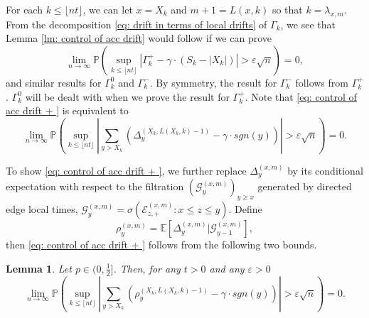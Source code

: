 \documentclass[twoside,12pt, a4paper]{article}
\newtheorem{lemma}{Lemma}[section]
\numberwithin{equation}{section}
\theoremstyle{remark}
\newcommand{\abs}[1]{\left\vert #1 \right\vert}
\newcommand{\comment}[1]{\textcolor{blue}{(Comment: #1)}}
\begin{document}
	For each $k\leq \lfloor nt\rfloor$, we can let $x = X_k$ and $ m +1=L(x,k)$ so that $k = \lambda_{x,m}$. From the decomposition \eqref{eq: drift in terms of local drifts} of $\Gamma_k$, we see that
	Lemma \ref{lm: control of acc drift} would follow if we can prove
	\begin{equation}\label{eq: control of acc drift + }
		\lim_{n \to \infty }\mathbb{P}\left(\sup_{k\leq\lfloor nt \rfloor} \abs{\Gamma^+_k - \gamma \cdot \left(S_k - \abs{X_k} \right)   } > \varepsilon \sqrt{n}  \right) =0, 
	\end{equation}
	and similar results for $\Gamma_k^0$ and $\Gamma_k^-$. By symmetry, the result for $\Gamma_k^-$ follows from $\Gamma_k^+$. 
	$\Gamma_k^0$ will be dealt with when we prove the result for $\Gamma_k^+$.
	Note that \eqref{eq: control of acc drift + } is equivalent to
	\begin{equation}
		\lim_{n \to \infty }\mathbb{P}\left(\sup_{k\leq\lfloor nt \rfloor} \abs{\sum_{y> X_k} \left( \Delta_{y}^{(X_k,L(X_k,k) - 1)} - \gamma  \cdot sgn(y) \right)   }  > \varepsilon \sqrt{n}  \right) =0. 
	\end{equation}
	
	To show \eqref{eq: control of acc drift + }, we further replace $\Delta_{y}^{(x,m)}$ by its conditional expectation with respect to the filtration $\left(\mathcal{G}_{y}^{(x,m)}\right)_{y\geq x}$ generated by directed edge local times, $ \mathcal{G}_{y}^{(x,m)} = \sigma\left( \mathcal{E}^{(x,m)}_{z,+} : x \le z \leq y \right)$.
	Define
	\begin{equation}\label{eq: conditional mean}
		\rho_{y}^{(x,m)}= \mathbb{E}\left[\Delta_y^{(x,m)} | \mathcal{G}_{y-1}^{(x,m)}\right],
	\end{equation}
	then \eqref{eq: control of acc drift + } follows from the following two bounds.
	\begin{lemma}\label{lm: approximation of means of local drift}
		Let $p\in (0,\frac{1}{2}]$. Then, for any $t>0$ and any $\varepsilon >0$
		\begin{equation}\label{eq: control of expected local drift}
			\lim_{n \to \infty }\mathbb{P}\left(\sup_{k\leq\lfloor nt \rfloor} \abs{\sum_{y> X_k} \left( \rho_{y}^{(X_k,L(X_k,k)-1)} - \gamma  \cdot sgn(y) \right)   }  > \varepsilon \sqrt{n}  \right) =0. 
		\end{equation}
	\end{lemma}
	
\end{document}

